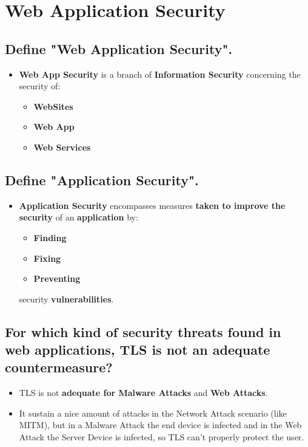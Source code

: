 \documentclass[9pt, letterpaper]{article}
\begin{document}
\newpage

\section{Web Application Security}

\subsection{Define "Web Application Security".}
\begin{itemize}
	\item \textbf{Web App Security} is a branch of \textbf{Information Security} concerning the security of:
	      \begin{itemize}
		      \item \textbf{WebSites}
		      \item \textbf{Web App}
		      \item \textbf{Web Services}
	      \end{itemize}
\end{itemize}

\subsection{Define "Application Security".}
\begin{itemize}
	\item \textbf{Application Security} encompasses measures \textbf{taken to improve the security} of an \textbf{application} by:
	      \begin{itemize}
		      \item \textbf{Finding}
		      \item \textbf{Fixing}
		      \item \textbf{Preventing}
	      \end{itemize}
	      security \textbf{vulnerabilities}.
\end{itemize}

\subsection{For which kind of security threats found in web applications, TLS is not an adequate countermeasure?}
\begin{itemize}
	\item TLS is not \textbf{adequate for Malware Attacks} and \textbf{Web Attacks}.
	\item It sustain a nice amount of attacks in the Network Attack scenario (like MITM), but in a Malware Attack the end device is infected and in the Web Attack the Server Device is infected, so TLS can't properly protect the user.
\end{itemize}
\end{document}
